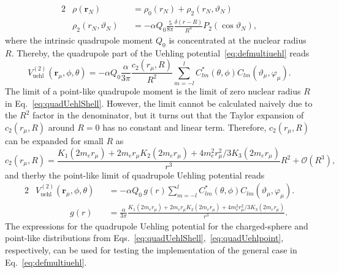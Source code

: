 \begin{alignat}{2}
&\rho(\mathbf{r}_N)&&=\rho_0(r_N) + \rho_2(r_N,\vartheta_N)\\
&\rho_2(r_N,\vartheta_N)&&=-\alpha Q_0 \frac{5}{8\pi }\frac{\delta(r-R)}{R^4}
P_2(\cos\vartheta_N),
\end{alignat}
where the intrinsic quadrupole moment $Q_0$ is concentrated at the nuclear radius $R$. Thereby, the quadrupole part of the Uehling potential~\eqref{eq:defmultiuehl} reads
\begin{equation}
V^{(2)}_{\text{uehl}}(\mathbf{r}_\mu,\phi,\theta)= 
-\alpha Q_0 \frac{\alpha}{3\pi}\frac{c_2(r_\mu,R)}{R^2}\sum\limits_{m=-l}^{l} C_{lm}^*(\theta,\phi)C_{lm}(\vartheta_\mu,\varphi_\mu).
\label{eq:quadUehlShell}
\end{equation}
The limit of a point-like quadrupole moment is the limit of zero nuclear radius $R$ in Eq.~\eqref{eq:quadUehlShell}. However, the limit cannot be calculated naively due to the $R^{2}$ factor in the denominator, but it turns out that the Taylor expansion of $c_2(r_\mu,R)$ around $R=0$ has no constant and linear term. Therefore, $c_2(r_\mu,R)$ can be expanded for small $R$ as
\begin{equation}
c_2(r_\mu,R) = \frac{K_1(2m_er_\mu)+2m_er_\mu K_2(2m_er_\mu)+4m_e^2r_\mu^2/3K_3(2m_er_\mu)}{r^3}R^2 + \mathcal{O}(R^3),
\end{equation}
and therby the point-like limit of quadrupole Uehling potential reads
\begin{alignat}{2}
\label{eq:quadUehlpoint}
&V^{(2)}_{\text{uehl}}(\mathbf{r}_\mu,\phi,\theta)&&=
-\alpha Q_0\, g(r) \sum\limits_{m=-l}^{l} C_{lm}^*(\theta,\phi)C_{lm}(\vartheta_\mu,\varphi_\mu).\\
&\qquad\qquad g(r)&&=\frac{\alpha}{3\pi}\frac{K_1(2m_er_\mu)+2m_er_\mu K_2(2m_er_\mu)+4m_e^2r_\mu^2/3K_3(2m_er_\mu)}{r^3}.
\label{eq:quadUehlShellLimit}
\end{alignat}
The expressions for the quadrupole Uehling potential for the charged-sphere and point-like distributions from Eqs.~\eqref{eq:quadUehlShell},~\eqref{eq:quadUehlpoint}, respectively, can be used for testing the implementation of the general case in Eq.~\eqref{eq:defmultiuehl}.\\



